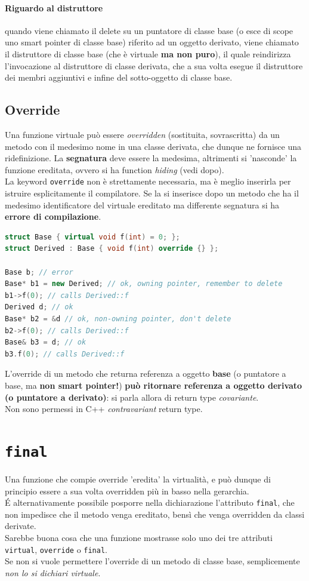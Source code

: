 \documentclass[10pt, oneside]{book}
\begin{document}
\paragraph{Riguardo al distruttore} quando viene chiamato il delete su un puntatore di classe base (o esce di scope uno smart pointer di classe base) riferito ad un oggetto derivato, viene chiamato il distruttore di classe base (che è virtuale \textbf{ma non puro}), il quale reindirizza l'invocazione al distruttore di classe derivata, che a sua volta esegue il distruttore dei membri aggiuntivi e infine del sotto-oggetto di classe base.

\subsection{Override}
Una funzione virtuale può essere \textit{overridden} (sostituita, sovrascritta) da un metodo con il medesimo nome in una classe derivata, che dunque ne fornisce una ridefinizione. La \textbf{segnatura} deve essere la medesima, altrimenti si 'nasconde' la funzione ereditata, ovvero si ha function \textit{hiding} (vedi dopo).\\
La keyword \texttt{override} non è strettamente necessaria, ma è meglio inserirla per istruire esplicitamente il compilatore. Se la si inserisce dopo un metodo che ha il medesimo identificatore del virtuale ereditato ma differente segnatura si ha \textbf{errore di compilazione}.

\begin{lstlisting}[language=C++]
struct Base { virtual void f(int) = 0; };
struct Derived : Base { void f(int) override {} };

Base b; // error
Base* b1 = new Derived; // ok, owning pointer, remember to delete
b1->f(0); // calls Derived::f
Derived d; // ok
Base* b2 = &d // ok, non-owning pointer, don't delete
b2->f(0); // calls Derived::f
Base& b3 = d; // ok
b3.f(0); // calls Derived::f
\end{lstlisting}
L'override di un metodo che returna referenza a oggetto \textbf{base} (o puntatore a base, ma \textbf{non smart pointer!}) \textbf{può ritornare referenza a oggetto derivato (o puntatore a derivato)}: si parla allora di return type \textit{covariante}.\\
Non sono permessi in C++ \textit{contravariant} return type.

\section{\texttt{final}}
Una funzione che compie override 'eredita' la virtualità, e può dunque di principio essere a sua volta overridden più in basso nella gerarchia.\\
\'E alternativamente possibile posporre nella dichiarazione l'attributo \texttt{final}, che non impedisce che il metodo venga ereditato, bensì che venga overridden da classi derivate.\\Sarebbe buona cosa che una funzione mostrasse solo uno dei tre attributi \texttt{virtual}, \texttt{override} o \texttt{final}.\\
Se non si vuole permettere l'override di un metodo di classe base, semplicemente \textit{non lo si dichiari virtuale}.
\end{document}
